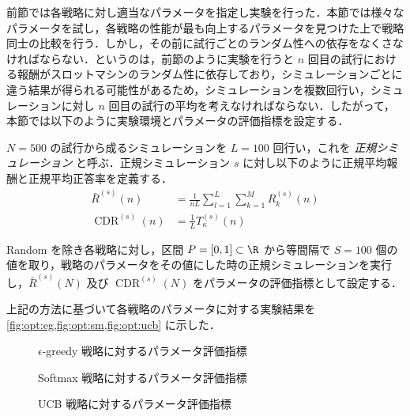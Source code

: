 \documentclass{jsarticle}
\DeclareMathOperator{\CDR}{CDR}
\newlength{\figwidth}
\begin{document}
前節では各戦略に対し適当なパラメータを指定し実験を行った．本節では様々なパラメータを試し，各戦略の性能が最も向上するパラメータを見つけた上で戦略同士の比較を行う．しかし，その前に試行ごとのランダム性への依存をなくさなければならない．というのは，前節のように実験を行うと $n$ 回目の試行における報酬がスロットマシンのランダム性に依存しており，シミュレーションごとに違う結果が得られる可能性があるため，シミュレーションを複数回行い，シミュレーションに対し $n$ 回目の試行の平均を考えなければならない．したがって，本節では以下のように実験環境とパラメータの評価指標を設定する．

$N = 500$ の試行から成るシミュレーションを $L=100$ 回行い，これを {\em 正規シミュレーション\/} と呼ぶ．正規シミュレーション $s$ に対し以下のように正規平均報酬と正規平均正答率を定義する．
\begin{align}
  \bar{R}^{(s)}(n) &= \frac{1}{nL}\sum_{l=1}^{L}\sum_{k=1}^{M} R_k^{(s)}(n) \\
  \CDR^{(s)}(n) &= \frac{1}{L}T_\kappa^{(s)}(n)
\end{align}

Random を除き各戦略に対し，区間 $P = [0, 1] \subset \R$ から等間隔で $S = 100$ 個の値を取り，戦略のパラメータをその値にした時の正規シミュレーションを実行し，$\bar{R}^{(s)}(N)$ 及び $\CDR^{(s)}(N)$ をパラメータの評価指標として設定する．

上記の方法に基づいて各戦略のパラメータに対する実験結果を \cref{fig:opt:eg,fig:opt:sm,fig:opt:ucb} に示した．

\begin{figure}[H]
\centering
{}
\caption{$\epsilon$-greedy 戦略に対するパラメータ評価指標}\label{fig:opt:eg}
\end{figure}

\begin{figure}[H]
\centering
{}
\caption{Softmax 戦略に対するパラメータ評価指標}\label{fig:opt:sm}
\end{figure}

\begin{figure}[H]
\centering
{}
\caption{UCB 戦略に対するパラメータ評価指標}\label{fig:opt:ucb}
\end{figure}
\end{document}
